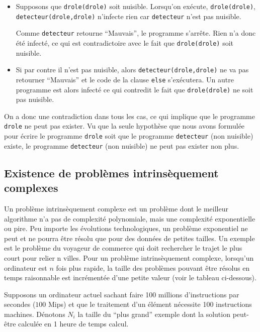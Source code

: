 \begin{itemize}
	\item Supposons que \lstinline|drole(drole)| soit nuisible.
      Lorsqu'on exécute, \lstinline|drole(drole)|, \\
      \lstinline|detecteur(drole,drole)| n'infecte rien car \lstinline|detecteur| n'est pas nuisible.

      Comme \lstinline|detecteur| retourne ``Mauvais'',
      le programme s'arrête.
      Rien n'a donc été infecté, ce qui est contradictoire avec le fait que \lstinline|drole(drole)| soit nuisible.
	\item Si par contre il n'est pas nuisible, alors \lstinline|detecteur(drole,drole)|
      ne va pas retourner ``Mauvais'' et le code de la clause \lstinline|else| s'exécutera.
      Un autre programme est alors infecté ce qui contredit le fait que \lstinline|drole(drole)| ne soit pas nuisible.
\end{itemize}

On a donc une contradiction dans tous les cas, ce qui implique que le programme \lstinline|drole| ne peut pas
exister. Vu que la seule hypothèse que nous avons formulée pour écrire le programme \lstinline|drole| soit que le programme \lstinline|detecteur| (non nuisible) existe,
le programme \lstinline|detecteur| (non nuisible) ne peut pas exister non plus.

\subsection{ Existence de problèmes intrinsèquement complexes}
\label{subsec:existence_de_problemes_intrinsequement_complexes}

Un problème intrinsèquement complexe est un problème dont le meilleur algorithme n'a pas de complexité polynomiale, mais une complexité exponentielle ou pire.  Peu importe les évolutions technologiques, un problème exponentiel ne peut et ne pourra être résolu que pour des données de petites tailles.  Un exemple est le problème du voyageur de commerce qui doit rechercher le trajet le plus court pour relier n villes.  Pour un problème intrinsèquement complexe, lorsqu'un ordinateur est $n$ fois plus rapide,  la taille des problèmes pouvant être résolus en temps raisonnable est incrémentée d'une petite valeur (voir le tableau ci-dessous).

Supposons un ordinateur actuel sachant faire 100 millions d'instructions par secondes ($100$ Mips) et que le traitement d'un élément nécessite 100 instructions machines.  Dénotons $N_i$  la taille du ``plus grand'' exemple dont la solution peut-être calculée en 1 heure de temps calcul.

